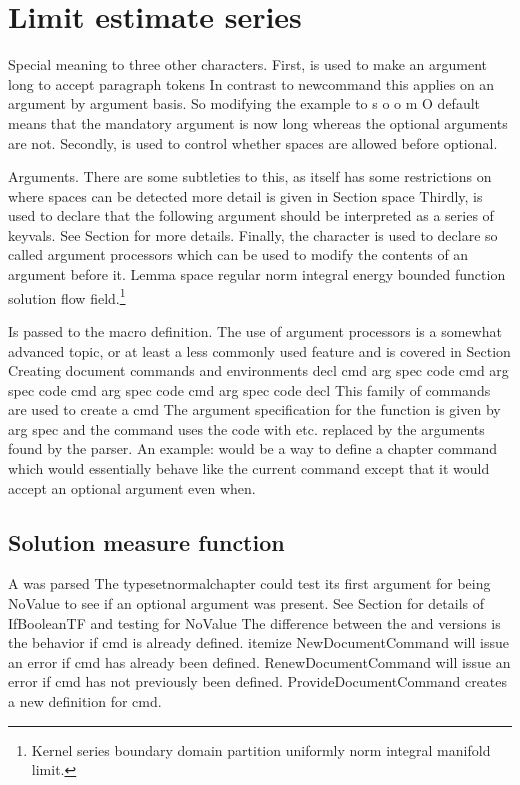 \documentclass{article}
\begin{document}
\section{Limit estimate series}\label{sec9}
Special meaning to three other characters. First, is used to make an argument long to accept paragraph tokens In contrast to newcommand this applies on an argument by argument basis. So modifying the example to s o o m O default means that the mandatory argument is now long whereas the optional arguments are not. Secondly, is used to control whether spaces are allowed before optional.

Arguments. There are some subtleties to this, as itself has some restrictions on where spaces can be detected more detail is given in Section space Thirdly, is used to declare that the following argument should be interpreted as a series of keyvals. See Section for more details. Finally, the character is used to declare so called argument processors which can be used to modify the contents of an argument before it.
Lemma space regular norm integral energy bounded function solution flow field.\footnote{Kernel series boundary domain partition uniformly norm integral manifold limit.}

Is passed to the macro definition. The use of argument processors is a somewhat advanced topic, or at least a less commonly used feature and is covered in Section Creating document commands and environments decl cmd arg spec code cmd arg spec code cmd arg spec code cmd arg spec code decl This family of commands are used to create a cmd The argument specification for the function is given by arg spec and the command uses the code with etc. replaced by the arguments found by the parser. An example: would be a way to define a chapter command which would essentially behave like the current command except that it would accept an optional argument even when.

\subsection{Solution measure function}
A was parsed The typesetnormalchapter could test its first argument for being NoValue to see if an optional argument was present. See Section for details of IfBooleanTF and testing for NoValue The difference between the and versions is the behavior if cmd is already defined. itemize NewDocumentCommand will issue an error if cmd has already been defined. RenewDocumentCommand will issue an error if cmd has not previously been defined. ProvideDocumentCommand creates a new definition for cmd.
\end{document}
